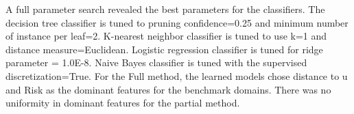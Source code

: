 \documentclass[letterpaper]{article}
\theoremstyle{plain}
\begin{document}
A full parameter search revealed the best parameters for the classifiers. The decision tree classifier is tuned to pruning confidence=0.25 and minimum number of instance per leaf=2. K-nearest neighbor classifier is tuned to use k=1 and distance measure=Euclidean. Logistic regression classifier is tuned for ridge parameter = 1.0E-8. Naive Bayes classifier is tuned with the supervised discretization=True. For the Full method, the learned models chose distance to $\mathrm{u}$ and Risk as the dominant features for the benchmark domains. There was no uniformity in dominant features for the partial method.

% 
 
\end{document}
